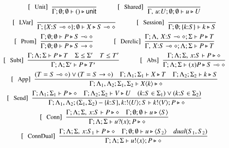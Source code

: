 \begin{figure}[!t]
\[
	\begin{array}{c}
	\jrule{ }{\Gamma ; \emptyset; \emptyset \vdash \UnitV \hastype \Unit}{Unit} 
	 \qquad\quad  
	\jrule{ }{\Gamma, \, u{:}U ; \emptyset; \emptyset \vdash u \hastype U}{Shared} 
	\vspace{2mm}
	\\
	\jrule{ }{\Gamma ; \{X{:}\lhot{S}\}; \emptyset \vdash X \hastype \lhot{S}}{LVar} 
	 \qquad\quad 
	\jrule{ }{\Gamma ; \emptyset ; \{k{:}S\} \vdash k \hastype S}{Session} 
	\vspace{2mm}
	\\
	\jrule{\Gamma ; \emptyset; \emptyset \vdash P \hastype \lhot{S} }{\Gamma ; \emptyset; \emptyset \vdash P \hastype \shot{S}}{Prom} 
	 \qquad\quad  
	\jrule{ \Gamma ; \Lambda ,\, X{:}\lhot{S}; \Sigma \vdash P \hastype T }{ \Gamma,\, X{:}\lhot{S}; \Lambda ; \Sigma \vdash P \hastype T}{Derelic} 
	\vspace{2mm}
	\\
	\jrule{\Gamma ; \Lambda; \Sigma \vdash P \hastype T  \quad \Sigma \subt \Sigma' \quad T \subt T'}{\Gamma ; \Lambda; \Sigma' \vdash P \hastype T'}{Subt} 
	\qquad\quad  
	\jrule{ \Gamma ; \Lambda; \Sigma,\, x{:} S \vdash P \hastype \Proc }{ \Gamma ; \Lambda; \Sigma \vdash (x)P \hastype \lhot{S}}{Abs} 
	\vspace{2mm}
	\\
	\jrule{(T = \lhot{S}) \lor (T = \shot{S}) \quad \Gamma ; \Lambda_1; \Sigma_1 \vdash X \hastype T  \quad \Gamma ; \Lambda_2; \Sigma_2 \vdash k \hastype S}{\Gamma ; \Lambda_1, \Lambda_2; \Sigma_1, \Sigma_2 \vdash \appl{X}{k} \hastype \Proc}{App} 
	\vspace{2mm}
	\\
	\jrule{\Gamma ; \Lambda_1; \Sigma_1 \vdash P \hastype \Proc  \quad \Gamma ; \Lambda_2; \Sigma_2 \vdash V \hastype U  \quad (k{:}S \in \Sigma_1) \lor (k{:}S \in \Sigma_2) }{\Gamma ; \Lambda_1, \Lambda_2; (\Sigma_1, \Sigma_2)-\{k{:}S\}, k{:}\btout{U} S \vdash \bout{k}{V} P \hastype \Proc}{Send} 
	\qquad\quad 
	\vspace{2mm}
	\\
	\jrule{\Gamma ; \Lambda; \Sigma, \, x{:}S \vdash P \hastype \Proc  \quad \Gamma ; \emptyset; \emptyset \vdash u \hastype \chtype{S} }{\Gamma ; \Lambda; \Sigma \vdash \binp{u}{x} P \hastype \Proc}{Conn} 
	\qquad\quad  
	\vspace{2mm}
	\\
	\jrule{\Gamma ; \Lambda; \Sigma, \, x{:}S_1 \vdash P \hastype \Proc  \quad \Gamma ; \emptyset; \emptyset \vdash u \hastype \chtype{S_2} \quad dual(S_1, S_2)}{\Gamma ; \Lambda; \Sigma \vdash \bout{u}{x} P \hastype \Proc}{ConnDual}

\end{array}\]
\end{figure}
